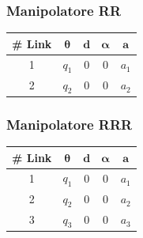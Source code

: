 \documentclass[11pt, a4paper]{report}
\begin{document}
\newpage
\begin{minipage}[t]{0.48\textwidth}
    \subsubsection*{Manipolatore RR}
    \centering
    \begin{tabular}{|c|c|c|c|c|}
        \hline
        \textbf{\# Link} & \(\boldsymbol{\theta}\) & \(\boldsymbol{d}\) & \(\boldsymbol{\alpha}\) & \(\boldsymbol{a}\) \\
        \hline
        1 & \(q_{1}\) & 0 & 0 & \(a_{1}\) \\
        \hline
        2 & \(q_{2}\) & 0 & 0 & \(a_{2}\) \\
        \hline
    \end{tabular}
\end{minipage}
\hfill
\begin{minipage}[t]{0.48\textwidth}
    \subsubsection*{Manipolatore RRR}
    \centering
    \begin{tabular}{|c|c|c|c|c|}
        \hline
        \textbf{\# Link} & \(\boldsymbol{\theta}\) & \(\boldsymbol{d}\) & \(\boldsymbol{\alpha}\) & \(\boldsymbol{a}\) \\
        \hline
        1 & \(q_{1}\) & 0 & 0 & \(a_{1}\) \\
        \hline
        2 & \(q_{2}\) & 0 & 0 & \(a_{2}\) \\
        \hline
        3 & \(q_{3}\) & 0 & 0 & \(a_{3}\) \\
        \hline
    \end{tabular}
\end{minipage}

\vspace{1cm} %
\end{document}

